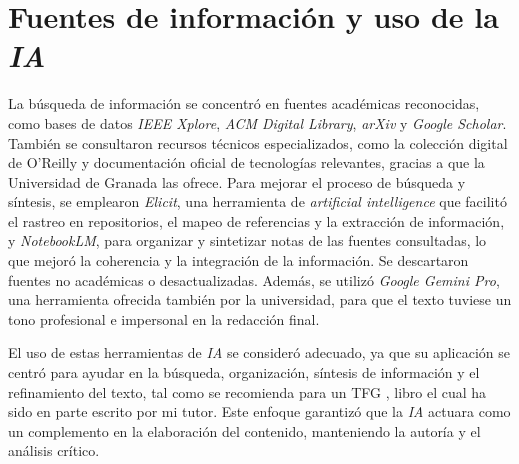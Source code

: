 \section*{Fuentes de información y uso de la \textit{IA}}
La búsqueda de información se concentró en fuentes académicas reconocidas, como bases de datos \textit{IEEE Xplore}, \textit{ACM Digital Library}, \textit{arXiv} y \textit{Google Scholar}. También se consultaron recursos técnicos especializados, como la colección digital de O'Reilly y documentación oficial de tecnologías relevantes, gracias a que la Universidad de Granada las ofrece. Para mejorar el proceso de búsqueda y síntesis, se emplearon \textit{Elicit}, una herramienta de \textit{artificial intelligence} que facilitó el rastreo en repositorios, el mapeo de referencias y la extracción de información, y \textit{NotebookLM}, para organizar y sintetizar notas de las fuentes consultadas, lo que mejoró la coherencia y la integración de la información. Se descartaron fuentes no académicas o desactualizadas. Además, se utilizó \textit{Google Gemini Pro}, una herramienta ofrecida también por la universidad, para que el texto tuviese un tono profesional e impersonal en la redacción final.

El uso de estas herramientas de \textit{IA} se consideró adecuado, ya que su aplicación se centró para ayudar en la búsqueda, organización, síntesis de información y el refinamiento del texto, tal como se recomienda para un TFG \cite{ref34}, libro el cual ha sido en parte escrito por mi tutor. Este enfoque garantizó que la \textit{IA} actuara como un complemento en la elaboración del contenido, manteniendo la autoría y el análisis crítico.

